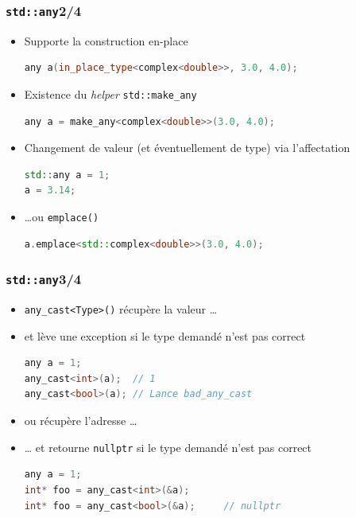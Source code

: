 \documentclass[C++.tex]{subfiles}
\begin{document}
\begin{frame}[fragile]
	\frametitle{\lstinline|std::any|\titlehfill{}2/4}
	\begin{itemize}
		\item Supporte la construction \og en-place\fg{}

			\begin{lstlisting}[language=C++]
any a(in_place_type<complex<double>>, 3.0, 4.0);\end{lstlisting}

		\item Existence du \textit{helper} \lstinline|std::make_any|

			\begin{lstlisting}[language=C++]
any a = make_any<complex<double>>(3.0, 4.0);\end{lstlisting}

		\item Changement de valeur (et éventuellement de type) via l'affectation

			\begin{lstlisting}[language=C++]
std::any a = 1;
a = 3.14;
\end{lstlisting}
	
		\item \ldots ou \lstinline|emplace()|
			\begin{lstlisting}[language=C++]
a.emplace<std::complex<double>>(3.0, 4.0);
\end{lstlisting}

	\end{itemize}
\end{frame}

\begin{frame}[fragile]
	\frametitle{\lstinline|std::any|\titlehfill{}3/4}
	\begin{itemize}
		\item \lstinline|any_cast<Type>()| récupère la valeur \ldots
		\item et lève une exception si le type demandé n'est pas correct

		\begin{lstlisting}[language=C++]
any a = 1;
any_cast<int>(a);  // 1
any_cast<bool>(a); // Lance bad_any_cast\end{lstlisting}

		\item ou récupère l'adresse \ldots
		\item \ldots{} et retourne \lstinline|nullptr| si le type demandé n'est pas correct

		\begin{lstlisting}[language=C++]
any a = 1;
int* foo = any_cast<int>(&a);
int* foo = any_cast<bool>(&a);     // nullptr\end{lstlisting}
	\end{itemize}
\end{frame}
\end{document}
